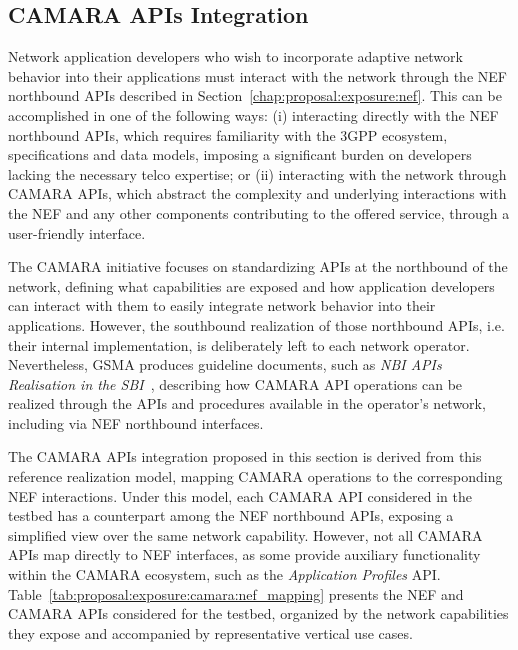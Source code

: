 \subsection{CAMARA \acsp{API} Integration}
\label{chap:proposal:exposure:camara}

Network application developers who wish to incorporate adaptive network behavior into their applications must interact with the network through the \acs{NEF} northbound \acsp{API} described in Section~\ref{chap:proposal:exposure:nef}. This can be accomplished in one of the following ways: (i) interacting directly with the \acs{NEF} northbound \acsp{API}, which requires familiarity with the \acs{3GPP} ecosystem, specifications and data models, imposing a significant burden on developers lacking the necessary telco expertise; or (ii) interacting with the network through CAMARA \acsp{API}, which abstract the complexity and underlying interactions with the \acs{NEF} and any other components contributing to the offered service, through a user-friendly interface.

The CAMARA initiative focuses on standardizing \acsp{API} at the northbound of the network, defining what capabilities are exposed and how application developers can interact with them to easily integrate network behavior into their applications. However, the southbound realization of those northbound \acsp{API}, i.e. their internal implementation, is deliberately left to each network operator. Nevertheless, \acs{GSMA} produces guideline documents, such as \textit{\acs{NBI} \acsp{API} Realisation in the \acs{SBI}}~\cite{gsmaNbiRealization}, describing how CAMARA \acs{API} operations can be realized through the \acsp{API} and procedures available in the operator's network, including via \acs{NEF} northbound interfaces.

The CAMARA \acsp{API} integration proposed in this section is derived from this reference realization model, mapping CAMARA operations to the corresponding \acs{NEF} interactions. Under this model, each CAMARA \acs{API} considered in the testbed has a counterpart among the \acs{NEF} northbound \acsp{API}, exposing a simplified view over the same network capability. However, not all CAMARA \acsp{API} map directly to \acs{NEF} interfaces, as some provide auxiliary functionality within the CAMARA ecosystem, such as the \textit{Application Profiles} \acs{API}. Table~\ref{tab:proposal:exposure:camara:nef_mapping} presents the \acs{NEF} and CAMARA \acsp{API} considered for the testbed, organized by the network capabilities they expose and accompanied by representative vertical use cases.

